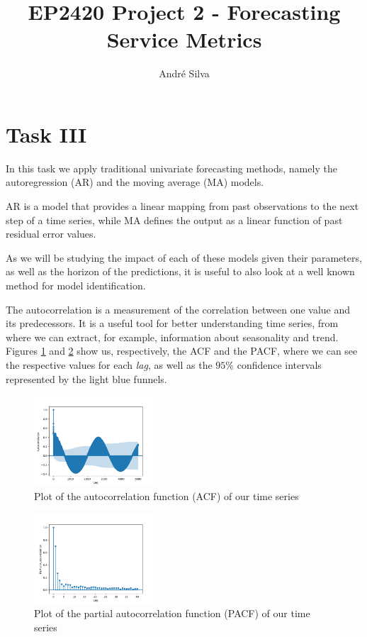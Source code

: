 \documentclass[10pt]{article}
\title{EP2420 Project 2 - Forecasting Service Metrics}
\author{André Silva}
\begin{document}
\maketitle

\section*{Task III}
\label{sec:3}

In this task we apply traditional univariate forecasting methods, namely the autoregression (AR) and the moving average (MA) models.

AR is a model that provides a linear mapping from past observations to the next step of a time series, while MA defines the output as a linear function of past residual error values.

As we will be studying the impact of each of these models given their parameters, as well as the horizon of the predictions, it is useful to also look at a well known method for model identification. 

The autocorrelation is a measurement of the correlation between one value and its predecessors. It is a useful tool for better understanding time series, from where we can extract, for example, information about seasonality and trend. Figures \ref{fig:3} and \ref{fig:4} show us, respectively, the ACF and the PACF, where we can see the respective values for each \textit{lag}, as well as the $95\%$ confidence intervals represented by the light blue funnels.

\begin{figure}[!ht]
    \centering
    \includegraphics[width=0.40\textwidth,height=\textheight,keepaspectratio]{../acf.png}
    \caption{Plot of the autocorrelation function (ACF) of our time series}
    \label{fig:3}
\end{figure}

\begin{figure}[!ht]
    \centering
    \includegraphics[width=0.40\textwidth,height=\textheight,keepaspectratio]{../pacf.png}
    \caption{Plot of the partial autocorrelation function (PACF) of our time series}
    \label{fig:4}
\end{figure}
\end{document}
